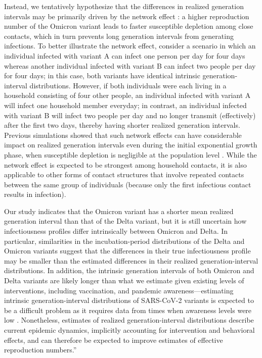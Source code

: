 \documentclass[12pt]{article}
\begin{document}
Instead, we tentatively hypothesize that the differences in realized generation intervals may be primarily driven by the network effect \citep{park2020inferring,hart2022generation}: a higher reproduction number of the Omicron variant leads to faster susceptible depletion among close contacts, which in turn prevents long generation intervals from generating infections. 
To better illustrate the network effect, consider a scenario in which an individual infected with variant A can infect one person per day for four days whereas another individual infected with variant B can infect two people per day for four days;
in this case, both variants have identical intrinsic generation-interval distributions.
However, if both individuals were each living in a household consisting of four other people, an individual infected with variant A will infect one household member everyday; in contrast, an individual infected with variant B will infect two people per day and no longer transmit (effectively) after the first two days, thereby having shorter realized generation intervals.
Previous simulations showed that such network effects can have considerable impact on realized generation intervals even during the initial exponential growth phase, when susceptible depletion is negligible at the population level \citep{park2020inferring}.
While the network effect is expected to be strongest among household contacts, it is also applicable to other forms of contact structures that involve repeated contacts between the same group of individuals (because only the first infectious contact results in infection).

Our study indicates that the Omicron variant has a shorter mean realized generation interval than that of the Delta variant, but it is still uncertain how infectiousness profiles differ intrinsically between Omicron and Delta.
In particular, similarities in the incubation-period distributions of the Delta and Omicron variants suggest that the differences in their true infectiousness profile may be smaller than the estimated differences in their realized generation-interval distributions.
In addition, the intrinsic generation intervals of both Omicron and Delta variants are likely longer than what we estimate given existing levels of interventions, including vaccination, and pandemic awareness---estimating intrinsic generation-interval distributions of SARS-CoV-2 variants is expected to be a difficult problem as it requires data from times when awareness levels were low \citep{sender2021unmitigated}.
Nonetheless, estimates of realized generation-interval distributions describe current epidemic dynamics, implicitly accounting for intervention and behavioral effects,
and can therefore be expected to improve estimates of effective reproduction numbers.''
\end{document}
